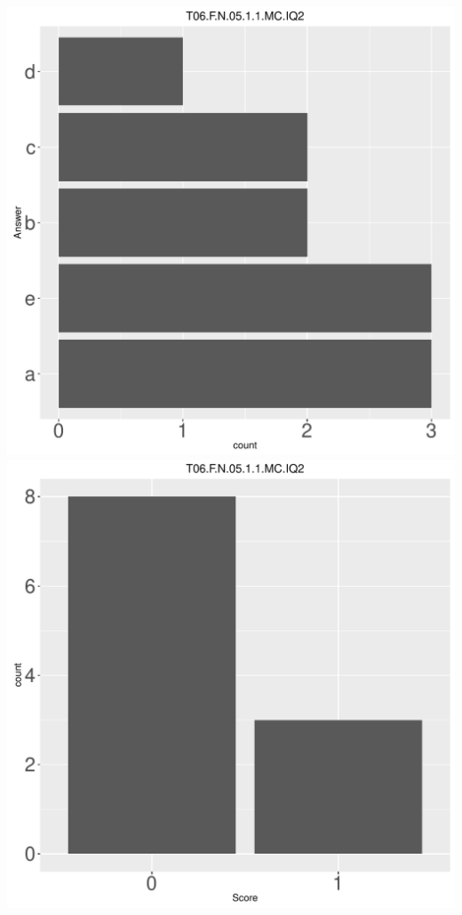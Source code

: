 \documentclass[12pt,english,nohyper]{tufte-handout}\usepackage[]{graphicx}\usepackage[]{color}
\begin{document}
\begin{center} \includegraphics[width=.45\linewidth]{Topic06_AB_52_answer} \includegraphics[width=.45\linewidth]{Topic06_AB_52_score} \end{center} 
\end{document}
